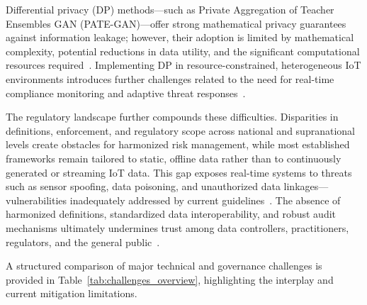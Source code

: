 \documentclass[sigconf]{acmart}
\begin{document}
Differential privacy (DP) methods---such as Private Aggregation of Teacher Ensembles GAN (PATE-GAN)---offer strong mathematical privacy guarantees against information leakage; however, their adoption is limited by mathematical complexity, potential reductions in data utility, and the significant computational resources required~\cite{ref91,ref90}. Implementing DP in resource-constrained, heterogeneous IoT environments introduces further challenges related to the need for real-time compliance monitoring and adaptive threat responses~\cite{ref2,ref4,ref5,ref6,ref7,ref8,ref9,ref24,ref25,ref28,ref30,ref31,ref33,ref34,ref35,ref36,ref41,ref43,ref46,ref50,ref54,ref51,ref61,ref62,ref63,ref64,ref65,ref70,ref71,ref72,ref75,ref76,ref77,ref78,ref79,ref82,ref83,ref84,ref90,ref91}.

The regulatory landscape further compounds these difficulties. Disparities in definitions, enforcement, and regulatory scope across national and supranational levels create obstacles for harmonized risk management, while most established frameworks remain tailored to static, offline data rather than to continuously generated or streaming IoT data. This gap exposes real-time systems to threats such as sensor spoofing, data poisoning, and unauthorized data linkages---vulnerabilities inadequately addressed by current guidelines~\cite{ref4,ref5,ref10,ref24,ref25,ref30,ref31,ref33,ref34,ref35,ref36,ref41,ref43,ref46,ref50,ref54,ref61,ref62,ref63,ref64,ref65,ref76,ref77,ref82,ref83,ref84,ref91}. The absence of harmonized definitions, standardized data interoperability, and robust audit mechanisms ultimately undermines trust among data controllers, practitioners, regulators, and the general public~\cite{ref91,ref82,ref83,ref84}.

A structured comparison of major technical and governance challenges is provided in Table~\ref{tab:challenges_overview}, highlighting the interplay and current mitigation limitations.
\end{document}
